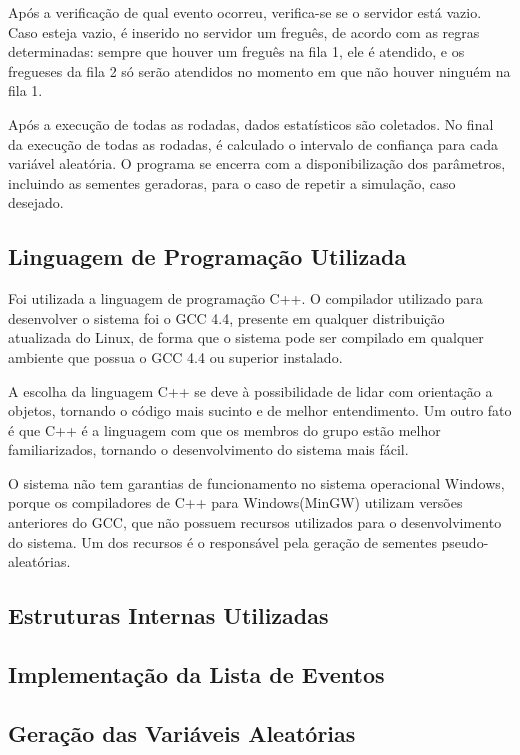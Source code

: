 \documentclass[a4paper,10pt]{article}
\begin{document}
    Após a verificação de qual evento ocorreu, verifica-se se o servidor está vazio. Caso esteja vazio, é inserido no servidor um freguês, de acordo com as regras
determinadas: sempre que houver um freguês na fila 1, ele é atendido, e os fregueses da fila 2 só serão atendidos no momento em que não houver ninguém na fila 1.

    Após a execução de todas as rodadas, dados estatísticos são coletados. No final da execução de todas as rodadas, é calculado o intervalo de confiança para cada
variável aleatória. O programa se encerra com a disponibilização dos parâmetros, incluindo as sementes geradoras, para o caso de repetir a simulação, caso desejado.

\subsection{Linguagem de Programação Utilizada}
    Foi utilizada a linguagem de programação C++. O compilador utilizado para desenvolver o sistema foi o GCC 4.4, presente em qualquer distribuição atualizada do Linux, de forma que o sistema pode ser compilado em qualquer ambiente que possua o GCC 4.4 ou superior instalado.

    A escolha da linguagem C++ se deve à possibilidade de lidar com orientação a objetos, tornando o código mais sucinto e de melhor entendimento. Um outro fato é que C++ é a linguagem com que os membros do grupo estão melhor familiarizados, tornando o desenvolvimento do sistema mais fácil.

    O sistema não tem garantias de funcionamento no sistema operacional Windows, porque os compiladores de C++ para Windows(MinGW) utilizam versões anteriores do GCC, que não possuem recursos utilizados para o desenvolvimento do sistema. Um dos recursos é o responsável pela geração de sementes pseudo-aleatórias.
\subsection{Estruturas Internas Utilizadas}
\subsection{Implementação da Lista de Eventos}
\subsection{Geração das Variáveis Aleatórias}
\end{document}
